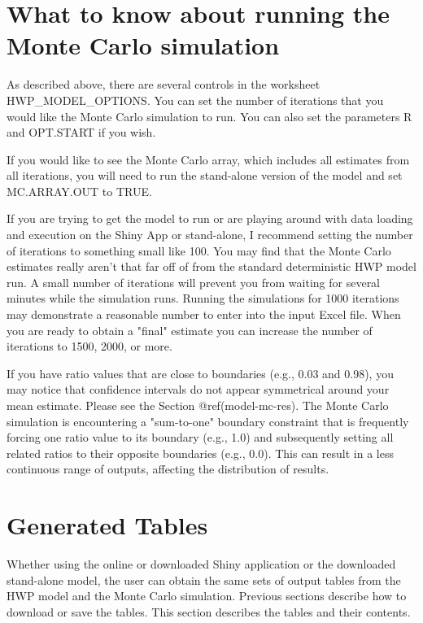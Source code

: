 \documentclass[
  openany]{book}
\begin{document}
\hypertarget{own-mc}{%
\section{What to know about running the Monte Carlo
simulation}\label{own-mc}}

As described above, there are several controls in the worksheet
HWP\_MODEL\_OPTIONS. You can set the number of iterations that you would
like the Monte Carlo simulation to run. You can also set the parameters
R and OPT.START if you wish.

If you would like to see the Monte Carlo array, which includes all
estimates from all iterations, you will need to run the stand-alone
version of the model and set MC.ARRAY.OUT to TRUE.

If you are trying to get the model to run or are playing around with
data loading and execution on the Shiny App or stand-alone, I recommend
setting the number of iterations to something small like 100. You may
find that the Monte Carlo estimates really aren't that far off of from
the standard deterministic HWP model run. A small number of iterations
will prevent you from waiting for several minutes while the simulation
runs. Running the simulations for 1000 iterations may demonstrate a
reasonable number to enter into the input Excel file. When you are ready
to obtain a "final" estimate you can increase the number of iterations
to 1500, 2000, or more.

If you have ratio values that are close to boundaries (e.g., 0.03 and
0.98), you may notice that confidence intervals do not appear
symmetrical around your mean estimate. Please see the Section
@ref(model-mc-res). The Monte Carlo simulation is encountering a
"sum-to-one" boundary constraint that is frequently forcing one ratio
value to its boundary (e.g., 1.0) and subsequently setting all related
ratios to their opposite boundaries (e.g., 0.0). This can result in a
less continuous range of outputs, affecting the distribution of results.

\hypertarget{own-tables}{%
\section{Generated Tables}\label{own-tables}}

Whether using the online or downloaded Shiny application or the
downloaded stand-alone model, the user can obtain the same sets of
output tables from the HWP model and the Monte Carlo simulation.
Previous sections describe how to download or save the tables. This
section describes the tables and their contents.
\end{document}
